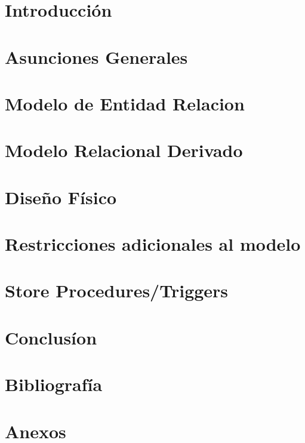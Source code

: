 \documentclass[a4paper,11pt]{article}
\begin{document}


\newpage

\tableofcontents


\newpage

\section{Introducción}

 

\newpage

\section{Asunciones Generales}



\section{Modelo de Entidad Relacion}



\newpage

\section{Modelo Relacional Derivado}



\newpage

\section{Dise\~{n}o F\'isico}



\newpage


\section{Restricciones adicionales al modelo}



\newpage

\section{Store Procedures/Triggers}



\newpage

\section{Conclusíon}



\newpage

\section{Bibliograf\'ia}



\newpage

\section{Anexos}


\end{document}

